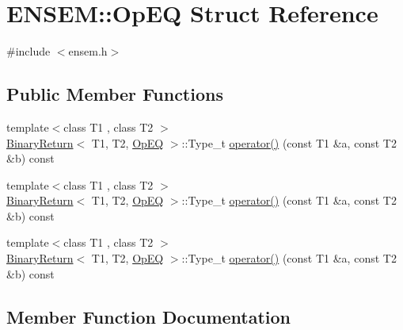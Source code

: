 \hypertarget{structENSEM_1_1OpEQ}{}\section{E\+N\+S\+EM\+:\+:Op\+EQ Struct Reference}
\label{structENSEM_1_1OpEQ}


{\ttfamily \#include $<$ensem.\+h$>$}

\subsection*{Public Member Functions}
\begin{DoxyCompactItemize}
\item 
{\footnotesize template$<$class T1 , class T2 $>$ }\\\mbox{\hyperlink{structENSEM_1_1BinaryReturn}{Binary\+Return}}$<$ T1, T2, \mbox{\hyperlink{structENSEM_1_1OpEQ}{Op\+EQ}} $>$\+::Type\+\_\+t \mbox{\hyperlink{structENSEM_1_1OpEQ_a91c7b46e62390256d4a5a7bad129f9b5}{operator()}} (const T1 \&a, const T2 \&b) const
\item 
{\footnotesize template$<$class T1 , class T2 $>$ }\\\mbox{\hyperlink{structENSEM_1_1BinaryReturn}{Binary\+Return}}$<$ T1, T2, \mbox{\hyperlink{structENSEM_1_1OpEQ}{Op\+EQ}} $>$\+::Type\+\_\+t \mbox{\hyperlink{structENSEM_1_1OpEQ_a91c7b46e62390256d4a5a7bad129f9b5}{operator()}} (const T1 \&a, const T2 \&b) const
\item 
{\footnotesize template$<$class T1 , class T2 $>$ }\\\mbox{\hyperlink{structENSEM_1_1BinaryReturn}{Binary\+Return}}$<$ T1, T2, \mbox{\hyperlink{structENSEM_1_1OpEQ}{Op\+EQ}} $>$\+::Type\+\_\+t \mbox{\hyperlink{structENSEM_1_1OpEQ_a91c7b46e62390256d4a5a7bad129f9b5}{operator()}} (const T1 \&a, const T2 \&b) const
\end{DoxyCompactItemize}


\subsection{Member Function Documentation}
\mbox{\label{structENSEM_1_1OpEQ_a91c7b46e62390256d4a5a7bad129f9b5}} 
